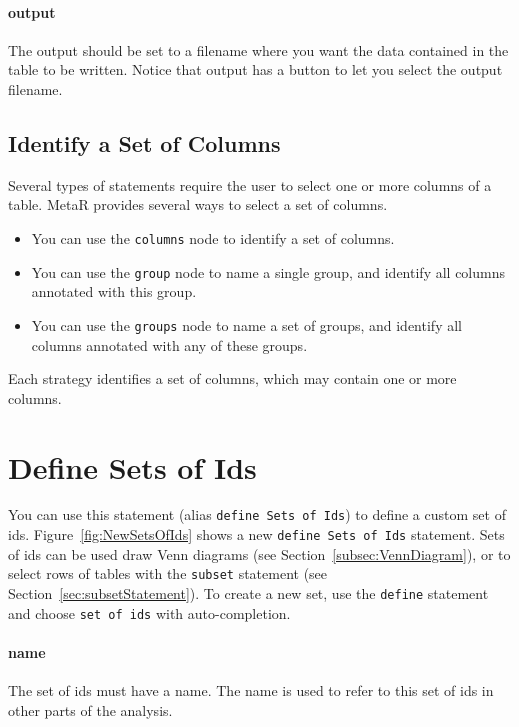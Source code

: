 \paragraph{output}
The output should be set to a filename where you want the data contained in the table to be written. Notice that output has a button to let you select the output filename.

\subsection{Identify a Set of Columns}\label{subsec:KeySelectionDescription}
Several types of statements require the user to select one or more columns of a table. MetaR provides several ways to select a set of columns. 
\begin{itemize}
  \item You can use the \texttt{columns} node to identify a set of columns. 
  \item You can use the \texttt{group} node to name a single group, and identify all columns annotated with this group.
  \item You can use the \texttt{groups} node to name a set of groups, and identify all columns annotated with any of these groups.
\end{itemize}

\noindent{}Each strategy identifies a set of columns, which may contain one or more columns.

\section{Define Sets of Ids}\label{sec:defineSetsOfIds}
You can use this statement (alias \texttt{define Sets of Ids}) to  define a custom set of ids. Figure~\ref{fig:NewSetsOfIds} shows a new \texttt{define Sets of Ids} statement. Sets of ids can be used draw Venn diagrams (see Section~\ref{subsec:VennDiagram}), or to select rows of tables with the \texttt{subset} statement (see Section~\ref{sec:subsetStatement}).   To create a new set, use the \texttt{define} statement and choose \texttt{set of ids} with auto-completion. 

\paragraph{name}
The set of ids must have a name. The name is used to refer to this set of ids in other parts of the analysis. 

